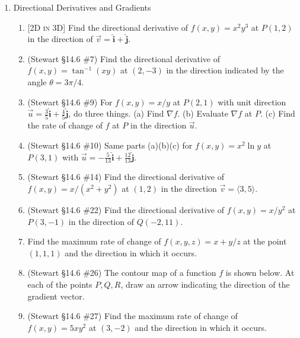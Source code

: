 \documentclass[12pt]{article}
\newcommand{\ihat}{\hat{\textbf{i}}}
\newcommand{\jhat}{\hat{\textbf{j}}}
\newcommand{\dimtag}[1]{{\footnotesize\textsc{[#1]}}\;}
\begin{document}
\begin{enumerate}
\item Directional Derivatives and Gradients
    \begin{enumerate}
        \item \dimtag{2D in 3D} Find the directional derivative of $f(x,y) = x^2 y^3$ at $P(1, 2)$ in the direction of $\vec{v} = \ihat + \jhat$.
        \item (Stewart \S14.6 \#7) Find the directional derivative of $f(x,y) = \tan^{-1}(xy)$ at $(2,-3)$ in the direction indicated by the angle $\theta = 3\pi/4$.
        \item (Stewart \S14.6 \#9) For $f(x,y) = x/y$ at $P(2,1)$ with unit direction $\vec u = \tfrac{3}{5}\ihat + \tfrac{4}{5}\jhat$, do three things.
        (a) Find $\nabla f$. (b) Evaluate $\nabla f$ at $P$. (c) Find the rate of change of $f$ at $P$ in the direction $\vec u$.
        \item (Stewart \S14.6 \#10) Same parts (a)(b)(c) for $f(x,y) = x^2 \ln y$ at $P(3,1)$ with $\vec u = -\tfrac{5}{13}\ihat + \tfrac{12}{13}\jhat$.
        \item (Stewart \S14.6 \#14) Find the directional derivative of $f(x,y) = x/(x^2+y^2)$ at $(1,2)$ in the direction $\vec v = \langle 3,5\rangle$.
        \item (Stewart \S14.6 \#22) Find the directional derivative of $f(x,y) = x/y^2$ at $P(3,-1)$ in the direction of $Q(-2,11)$.
        \item Find the maximum rate of change of $f(x,y,z) = x + y/z$ at the point $(1, 1, 1)$ and the direction in which it occurs.
        \item (Stewart \S14.6 \#26) The contour map of a function $f$ is shown below. At each of the points $P,Q,R$, draw an arrow indicating the direction of the gradient vector.
        \begin{center}
        \end{center}
        \item (Stewart \S14.6 \#27) Find the maximum rate of change of $f(x,y) = 5xy^2$ at $(3,-2)$ and the direction in which it occurs.

\end{enumerate}
\end{enumerate}
\end{document}

